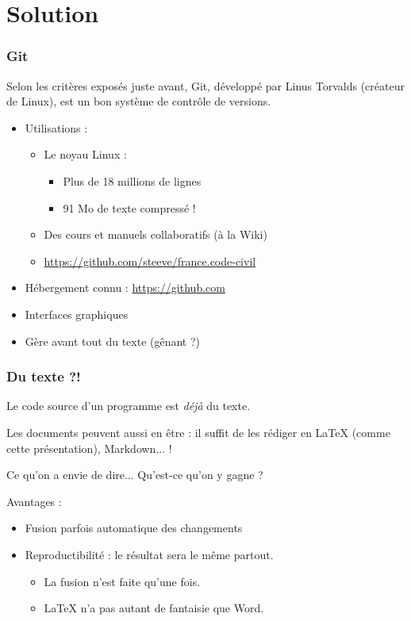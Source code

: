 \documentclass[compress]{beamer}
\newenvironment{envie}
	{\begin{block}{Ce qu'on a envie de dire...}}
	{\end{block}}
\begin{document}
\section{Solution}
\begin{frame}
	\frametitle{Git}
	Selon les critères exposés juste avant, Git,
	développé par Linus Torvalds (créateur de Linux),
	est un bon système de contrôle de versions. %

	\begin{itemize}
		\item Utilisations : \pause
			\begin{itemize}
				\item Le noyau Linux :
					\begin{itemize}
						\item Plus de 18 millions de lignes
						\item 91 Mo de texte compressé ! \pause
					\end{itemize}
				\item Des cours et manuels collaboratifs (à la Wiki) \pause
				\item \url{https://github.com/steeve/france.code-civil} \pause
			\end{itemize}
		\item Hébergement connu : \url{https://github.com} \pause
		\item Interfaces graphiques \pause
		\item Gère avant tout du texte (gênant ?)
	\end{itemize}
\end{frame}

\begin{frame}
	\frametitle{Du texte ?!}
	Le code source d'un programme est \emph{déjà} du texte.
	\pause

	Les documents peuvent aussi en être : il suffit de les rédiger en
	\LaTeX{} (comme cette présentation), Markdown... !
	\pause

	\begin{envie}
		Qu'est-ce qu'on y gagne ? \pause
	\end{envie}

	Avantages :
	\begin{itemize}
		\item Fusion parfois automatique des changements \pause
		\item Reproductibilité : le résultat sera le même partout. \pause
			\begin{itemize}
				\item La fusion n'est faite qu'une fois. \pause
				\item \LaTeX{} n'a pas autant de fantaisie que Word.
			\end{itemize}
	\end{itemize}
\end{frame}

\end{document}
